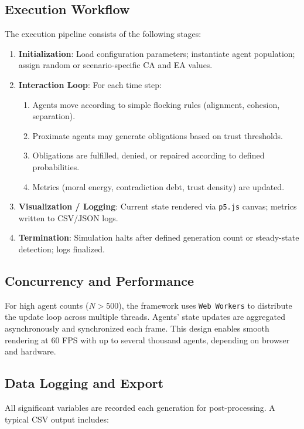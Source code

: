 \documentclass[11pt]{article}
\begin{document}
\subsection{Execution Workflow}

The execution pipeline consists of the following stages:
\begin{enumerate}
  \item \textbf{Initialization}: Load configuration parameters; instantiate agent population; assign random or scenario-specific CA and EA values.
  \item \textbf{Interaction Loop}: For each time step:
    \begin{enumerate}
      \item Agents move according to simple flocking rules (alignment, cohesion, separation).
      \item Proximate agents may generate obligations based on trust thresholds.
      \item Obligations are fulfilled, denied, or repaired according to defined probabilities.
      \item Metrics (moral energy, contradiction debt, trust density) are updated.
    \end{enumerate}
  \item \textbf{Visualization / Logging}: Current state rendered via \texttt{p5.js} canvas; metrics written to CSV/JSON logs.
  \item \textbf{Termination}: Simulation halts after defined generation count or steady-state detection; logs finalized.
\end{enumerate}

\subsection{Concurrency and Performance}

For high agent counts ($N > 500$), the framework uses \texttt{Web Workers} to distribute the update loop across multiple threads. Agents’ state updates are aggregated asynchronously and synchronized each frame. This design enables smooth rendering at 60 FPS with up to several thousand agents, depending on browser and hardware.

\subsection{Data Logging and Export}

All significant variables are recorded each generation for post-processing. A typical CSV output includes:
\end{document}
